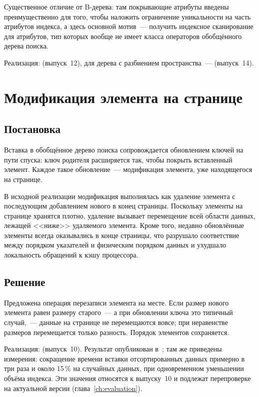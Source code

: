 Существенное отличие от B-дерева: там покрывающие атрибуты введены
преимущественно для того, чтобы наложить ограничение уникальности на часть
атрибутов индекса, а здесь основной мотив~--- получить индексное сканирование
для атрибутов, тип которых вообще не имеет класса операторов обобщённого дерева
поиска.

Реализация: 
(выпуск~12), для дерева с разбиением пространства~---
 (выпуск~14).

\section{Модификация элемента на странице}
\label{sec:overwrite}

\subsection{Постановка}

Вставка в обобщённое дерево поиска сопровождается обновлением ключей на пути
спуска: ключ родителя расширяется так, чтобы покрыть вставленный элемент. Каждое
такое обновление~--- модификация элемента, уже находящегося на странице.

В исходной реализации модификация выполнялась как удаление элемента с
последующим добавлением нового в конец страницы. Поскольку элементы на странице
хранятся плотно, удаление вызывает перемещение всей области данных, лежащей
<<ниже>> удаляемого элемента. Кроме того, недавно обновлённые элементы всегда
оказывались в конце страницы, что разрушало соответствие между порядком
указателей и физическим порядком данных и ухудшало локальность обращений к кэшу
процессора.

\subsection{Решение}

Предложена операция перезаписи элемента на месте. Если размер нового элемента
равен размеру старого~--- а при обновлении ключа это типичный случай,~--- данные
на странице не перемещаются вовсе; при неравенстве размеров перемещается только
разность. Порядок элементов сохраняется.

Реализация:  (выпуск~10). Результат опубликован
в~\cite{borodin2017memory}; там же приведены измерения: сокращение времени
вставки отсортированных данных примерно в три раза и около 15\,\% на случайных
данных, при одновременном уменьшении объёма индекса. Эти значения относятся к
выпуску~10 и подлежат перепроверке на актуальной версии
(глава~\ref{ch:evaluation}).

